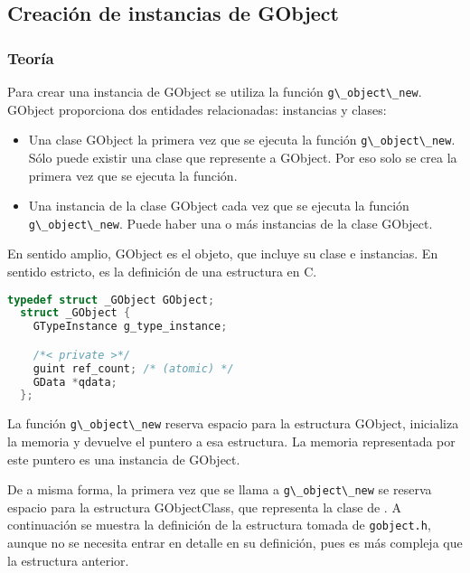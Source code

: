 \subsection{Creación de instancias de \textsf{GObject}} \label{subsec:creacion_instancias_gobject}

\subsubsection{Teoría}
Para crear una instancia de \textsf{GObject} se utiliza la función
\passthrough{\lstinline!g\_object\_new!}.
\textsf{GObject} proporciona dos entidades relacionadas: instancias y clases:
\begin{itemize}
  \tightlist
\item Una clase \textsf{GObject} la primera vez que se ejecuta la función
  \passthrough{\lstinline!g\_object\_new!}. Sólo puede existir una clase que represente a \textsf{GObject}.
  Por eso solo se crea la primera vez que se ejecuta la función.
\item Una instancia de la clase \textsf{GObject} cada vez que se ejecuta la función
  \passthrough{\lstinline!g\_object\_new!}. Puede haber una o más instancias de la clase \textsf{GObject}.
\end{itemize}

En sentido amplio, \textsf{GObject} es el objeto, que incluye su clase e instancias. En sentido estricto,
es la definición de una estructura en C.
\begin{lstlisting}[language=C]
  typedef struct _GObject GObject;
  struct _GObject {
    GTypeInstance g_type_instance;

    /*< private >*/
    guint ref_count; /* (atomic) */
    GData *qdata;
  };
\end{lstlisting}

La función \passthrough{\lstinline!g\_object\_new!} reserva espacio para la estructura \textsf{GObject},
inicializa la memoria y devuelve el puntero a esa estructura. La memoria representada por este puntero
es una instancia de \textsf{GObject}.

De a misma forma, la primera vez que se llama a \passthrough{\lstinline!g\_object\_new!} se reserva
espacio para la estructura \textsf{GObjectClass}, que representa la clase de . A continuación
se muestra la definición de la estructura tomada de \passthrough{\lstinline!gobject.h!}, aunque no se
necesita entrar en detalle en su definición, pues es más compleja que la estructura anterior.

